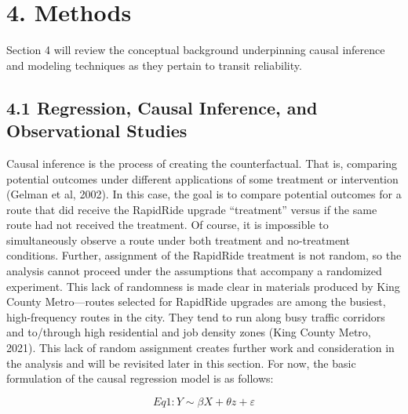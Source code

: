 \documentclass[
  12pt,
]{article}
\begin{document}
\section{4. Methods}\label{methods}

Section 4 will review the conceptual background underpinning causal
inference and modeling techniques as they pertain to transit
reliability.

\subsection{4.1 Regression, Causal Inference, and Observational
Studies}\label{regression-causal-inference-and-observational-studies}

Causal inference is the process of creating the counterfactual. That is,
comparing potential outcomes under different applications of some
treatment or intervention (Gelman et al, 2002). In this case, the goal
is to compare potential outcomes for a route that did receive the
RapidRide upgrade ``treatment'' versus if the same route had not
received the treatment. Of course, it is impossible to simultaneously
observe a route under both treatment and no-treatment conditions.
Further, assignment of the RapidRide treatment is not random, so the
analysis cannot proceed under the assumptions that accompany a
randomized experiment. This lack of randomness is made clear in
materials produced by King County Metro---routes selected for RapidRide
upgrades are among the busiest, high-frequency routes in the city. They
tend to run along busy traffic corridors and to/through high residential
and job density zones (King County Metro, 2021). This lack of random
assignment creates further work and consideration in the analysis and
will be revisited later in this section. For now, the basic formulation
of the causal regression model is as follows:

\[Eq 1: Y \sim \beta X + \theta z + \varepsilon\]
\end{document}
